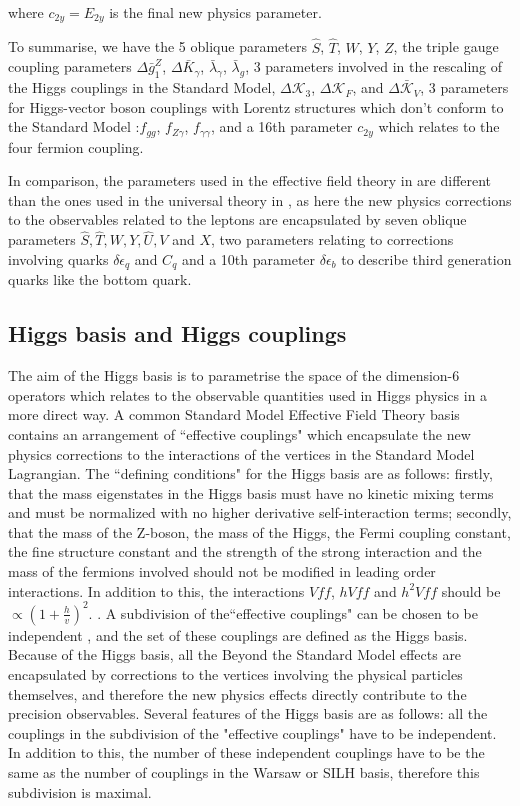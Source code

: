 \documentclass[11pt,oneside,a4paper]{article}
\begin{document}
where $c_{2y} = E_{2y}$ is the final new physics parameter.

To summarise, we have the 5 oblique parameters $\hat{S}$, $\hat{T}$, $W$, $Y$, $Z$, the triple gauge coupling parameters $\Delta\bar{g}_{1}^Z$, $\Delta\bar{K}_{\gamma}$, $\bar{\lambda}_{\gamma}$, $\bar{\lambda}_g$, 3 parameters involved in the rescaling of the Higgs couplings in the Standard Model, $\Delta\mathcal{K}_{3}$, $\Delta\mathcal{K}_{F}$, and $\Delta \bar{\mathcal{K}}_{V}$, 3 parameters for Higgs-vector boson couplings with Lorentz structures %
which don't conform to the Standard Model :$f_{gg}$, $f_{Z\gamma}$, $f_{\gamma\gamma}$, and a 16th parameter $c_{2y}$ which relates to the four fermion coupling. 

In comparison, the parameters used in the effective field theory in \cite{EWprecision} are different than the ones used in the universal theory in \cite{universal}, as here the new physics corrections to the observables related to the leptons are encapsulated by seven oblique parameters $\hat{S}, \hat{T}, W, Y, \hat{U}, V$ and $X$, two parameters relating to corrections involving quarks $\delta\epsilon_{q}$ and $C_{q}$ and a 10th parameter $\delta\epsilon_{b}$ to describe third generation quarks like the bottom quark.

\subsection{Higgs basis and Higgs couplings}

The aim of the Higgs basis is to parametrise the space of the dimension-6 operators which relates to the observable quantities used in Higgs physics in a more direct way. \cite{higgsbasis} A common Standard Model Effective Field Theory basis contains an arrangement of ``effective couplings" which encapsulate the new physics corrections to the interactions of the vertices in the Standard Model Lagrangian. The ``defining conditions" for the Higgs basis are as follows: firstly, that the mass eigenstates in the Higgs basis must have no kinetic mixing terms and must be normalized with no higher derivative self-interaction terms; secondly, that the mass of the Z-boson, the mass of the Higgs, the Fermi coupling constant, the fine structure constant and the strength of the strong interaction and the mass of the fermions involved should not be modified in leading order interactions. In addition to this, the interactions $Vff$, $hVff$ and $h^2Vff$ should be $\propto (1+\frac{h}{v})^2$. \cite{universal}. A subdivision of the``effective couplings" can be chosen to be independent \cite{higgsbasis}, and the set of these couplings are defined as the Higgs basis. Because of the Higgs basis, all the Beyond the Standard Model effects are encapsulated by corrections to the vertices involving the physical particles themselves, and therefore the new physics effects directly contribute to the precision observables. Several features of the Higgs basis are as follows: all the couplings in the subdivision of the "effective couplings" have to be independent. In addition to this, the number of these independent couplings have to be the same as the number of couplings in the Warsaw or SILH basis, therefore this subdivision is maximal.
\end{document}
